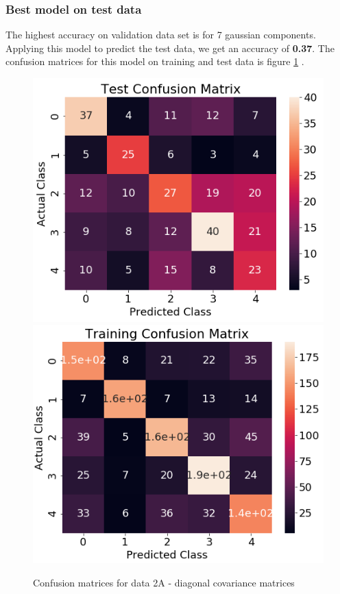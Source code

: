 \documentclass[11pt,a4paper]{article}
\begin{document}
\subsubsection{Best model on test data}
The highest accuracy on validation data set is for 7 gaussian components. Applying this model to predict the test data, we get an accuracy of \textbf{0.37}. The confusion matrices for this model on training and test data is figure \ref{fig:conf_2a_diag} .
\begin{figure}[H]
    \includegraphics[scale = 0.5]{images/conf_test2a.png}
    \includegraphics[scale = 0.5]{images/conf_train2a.png}
    \caption{Confusion matrices for data 2A - diagonal covariance matrices}
    \label{fig:conf_2a_diag}
\end{figure}
\end{document}
